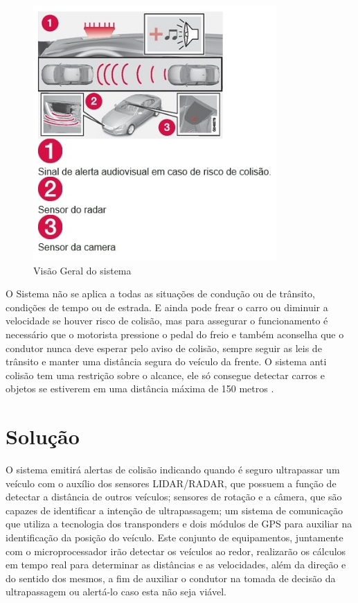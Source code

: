 \begin{figure}[h]
  \centering
  \includegraphics[width=350px, scale=0.5]{figuras/visao_geral}
  \caption{Visão Geral do sistema}
\label{fig:visao_geral}
\end{figure}

O Sistema não se aplica a todas as situações de condução ou de trânsito, condições de tempo ou de estrada. E ainda pode frear o carro ou diminuir a velocidade se houver risco de colisão, mas para assegurar o funcionamento é necessário que o motorista pressione o pedal do freio e também aconselha que o condutor nunca deve esperar pelo aviso de colisão, sempre seguir as leis de trânsito e manter uma distância segura do veículo da frente. 
O sistema anti colisão tem uma restrição sobre o alcance, ele só consegue detectar carros e objetos se estiverem em uma distância máxima de 150 metros \cite{volvo_system}. 

\section{Solução}

O sistema emitirá alertas de colisão indicando quando é seguro ultrapassar um veículo com o auxílio dos sensores LIDAR/RADAR, que possuem a função de detectar a distância de outros veículos; sensores de rotação e a câmera, que são capazes de identificar a intenção de ultrapassagem; um sistema de comunicação que utiliza a tecnologia dos transponders e dois módulos de GPS para auxiliar na identificação da posição do veículo. Este conjunto de equipamentos, juntamente com o microprocessador irão detectar os veículos ao redor, realizarão os cálculos em tempo real para determinar as distâncias e as velocidades, além da direção e do sentido dos mesmos, a fim de auxiliar o condutor na tomada de decisão da ultrapassagem ou alertá-lo caso esta não seja viável.

